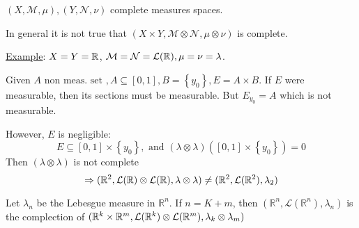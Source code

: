 \begin{remark} 
    \(\left(X, \mathcal{M}, \mu \right), \left(Y, \mathcal{N}, \nu \right)\) complete measures spaces. 
    
    In general it is not true that \((X \times Y, \mathcal{M} \otimes \mathcal{N}, \mu \otimes \nu)\) is complete.
\end{remark}
\underline{Example}: \(X = Y = \mathbb{R}\), \(\mathcal{M} = \mathcal{N} = \mathcal{L}(\mathbb{R}), \mu = \nu = \lambda\).

Given \(A \mbox{ non meas. set }, A \subseteq [0,1], B = \left\{ y_0 \right\}, E = A \times B\). 
If \(E\) were measurable, then its sections must be measurable. But \(E_{y_0} = A\) which is not measurable.

However, \(E\) is negligible:
\[
    E \subseteq [0,1] \times \left\{ y_0 \right\}, \mbox{ and } \left(\lambda \otimes \lambda\right)\left([0,1] \times \left\{ y_0 \right\}\right) = 0
\]
Then \((\lambda \otimes \lambda)\) is not complete 
\[
    \Rightarrow (\mathbb{R}^2, \mathcal{L}(\mathbb{R}) \otimes \mathcal{L}(\mathbb{R}), \lambda \otimes \lambda) \neq (\mathbb{R}^2, \mathcal{L}(\mathbb{R}^2), \lambda_2)
\]
\begin{theorem}
    Let \(\lambda_n\) be the Lebesgue measure in \(\mathbb{R}^n\). 
    If \(n= K+m\), then \(\left(\mathbb{R}^n, \mathcal{L}(\mathbb{R}^n), \lambda_n \right)\) is the complection of \( ( \mathbb{R}^k \times \mathbb{R}^m, \mathcal{L}(\mathbb{R}^k) \otimes \mathcal{L}(\mathbb{R}^m),\lambda_k \otimes \lambda_m )\)
\end{theorem}
